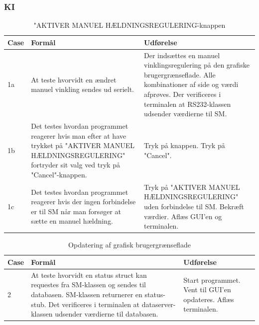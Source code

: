\subsubsection{KI}
\begin{table}[H]
\caption{"AKTIVER MANUEL HÆLDNINGSREGULERING\"-knappen}
\centering
\begin{tabular}{| p{1cm}  | p{4.5cm} | p{8cm} |}
\hline
Case &Formål &Udførelse\\\hline
1a &At teste hvorvidt en ændret manuel vinkling sendes ud serielt. &Der indsættes en manuel vinklingsregulering på den grafiske brugergrænseflade. Alle kombinationer af side og værdi afprøves. Der verificeres i terminalen at RS232-klassen udsender værdierne til SM.\\\hline

1b &Det testes hvordan programmet reagerer hvis man efter at have trykket på "AKTIVER MANUEL HÆLDNINGSREGULERING" fortryder sit valg ved tryk på "Cancel"-knappen.&Tryk på knappen. Tryk på "Cancel".\\\hline

1c &Det testes hvordan programmet reagerer hvis der ingen forbindelse er til SM når man forsøger at sætte en manuel hældning. &Tryk på "AKTIVER MANUEL HÆLDNINGSREGULERING" uden forbindelse til SM. Bekræft værdier. Aflæs GUI'en og terminalen.\\\hline
\end{tabular}
\end{table}

\begin{table}[H]
\caption{Opdatering af grafisk brugergrænseflade}
\centering
\begin{tabular}{| p{1cm}  | p{4.5cm} | p{8cm} |}
\hline
Case &Formål &Udførelse\\\hline

2 &At teste hvorvidt en status struct kan requestes fra SM-klassen og sendes til databasen. SM-klassen returnerer en status-stub. Det verificeres i terminalen at dataserver-klassen udsender værdierne til databasen.&Start programmet. Vent til GUI'en opdateres. Aflæs terminalen.\\\hline
\end{tabular}
\end{table}

